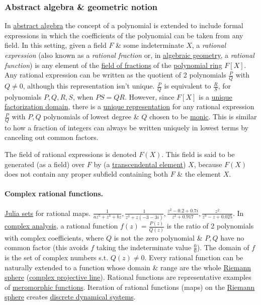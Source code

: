 \documentclass{article}
\begin{document}
\subsubsection{Abstract algebra \& geometric notion}
In \href{https://en.wikipedia.org/wiki/Abstract_algebra}{abstract algebra} the concept of a polynomial is extended to include formal expressions in which the coefficients of the polynomial can be taken from any field. In this setting, given a field $F$ \& some indeterminate $X$, a {\it rational expression} (also known as a {\it rational fraction} or, in \href{https://en.wikipedia.org/wiki/Algebraic_geometry}{algebraic geometry}, a {\it rational function}) is any element of the \href{https://en.wikipedia.org/wiki/Field_of_fractions}{field of fractions} of the \href{https://en.wikipedia.org/wiki/Polynomial_ring}{polynomial ring} $F[X]$. Any rational expression can be written as the quotient of 2 polynomials $\frac{P}{Q}$ with $Q\ne0$, although this representation isn't unique. $\frac{P}{Q}$ is equivalent to $\frac{R}{S}$, for polynomials $P,Q,R,S$, when $PS = QR$. However, since $F[X]$ is a \href{https://en.wikipedia.org/wiki/Unique_factorization_domain}{unique factorization domain}, there is a \href{https://en.wikipedia.org/wiki/Irreducible_fraction}{unique representation} for any rational expression $\frac{P}{Q}$ with $P,Q$ polynomials of lowest degree \& $Q$ chosen to be \href{https://en.wikipedia.org/wiki/Monic_polynomial}{monic}. This is similar to how a fraction of integers can always be written uniquely in lowest terms by canceling out common factors.

The field of rational expressions is denoted $F(X)$. This field is said to be generated (as a field) over $F$ by (a \href{https://en.wikipedia.org/wiki/Transcendental_element}{transcendental element}) $X$, because $F(X)$ does not contain any proper subfield containing both $F$ \& the element $X$.

\paragraph{Complex rational functions.} \href{https://en.wikipedia.org/wiki/Julia_set}{Julia sets} for rational maps. $\frac{1}{az^5 + z^3 + bz},\frac{1}{z^3 + z(-3 - 3i)},\frac{z^2 - 0.2 + 0.7i}{z^2 + 0.917},\frac{z^2}{z^9 - z + 0.025}$. In \href{https://en.wikipedia.org/wiki/Complex_analysis}{complex analysis}, a rational function $f(z) = \frac{P(z)}{Q(z)}$ is the ratio of 2 polynomials with complex coefficients, where $Q$ is not the zero polynomial \& $P,Q$ have no common factor (this avoids $f$ taking the indeterminate value $\frac{0}{0}$). The domain of $f$ is the set of complex numbers s.t. $Q(z)\ne0$. Every rational function can be naturally extended to a function whose domain \& range are the whole \href{https://en.wikipedia.org/wiki/Riemann_sphere}{Riemann sphere} (\href{https://en.wikipedia.org/wiki/Complex_projective_line}{complex projective line}). Rational functions are representative examples of \href{https://en.wikipedia.org/wiki/Meromorphic_function}{meromorphic functions}. Iteration of rational functions (maps) on the \href{https://en.wikipedia.org/wiki/Riemann_sphere}{Riemann sphere} creates \href{https://en.wikipedia.org/wiki/Discrete_dynamical_system}{discrete dynamical systems}.
\end{document}

